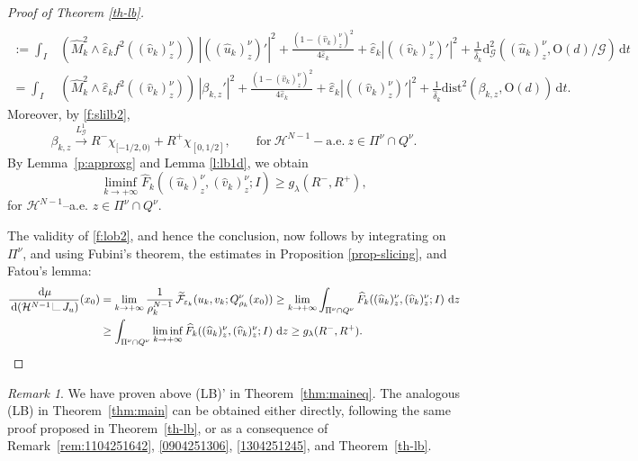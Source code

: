 \documentclass[a4paper,reqno]{amsart}
\newcommand{\dG}{\mathrm{d}_{\G}}
\newcommand\calH{\mathcal{H}}
\newcommand\toG{\xrightarrow{{L}^1_\G}}
\newcommand\dist{{\mathrm{dist}}}
\newcommand\eps{{\varepsilon}}
\newcommand\di{{\,\mathrm{d}}}
\newcommand\dt{{\,\mathrm{d}t}}
\newcommand{\LM}[1]{\hbox{\vrule width.2pt \vbox to#1pt{\vfill \hrule width#1pt height.2pt}}}
\newcommand{\LL}{{\mathchoice
{\,\LM7\,}{\,\LM7\,}{\,\LM5\,}{\,\LM{3.35}\,}}}
\theoremstyle{remark}
\newtheorem{remark}[definition]{Remark}
\def\e{\varepsilon}
\newcommand{\F}{\mathcal{F}}
\newcommand{\G}{\mathcal{G}}
\newcommand{\tF}{\widetilde{\F}}
\newcommand{\On}{\mathrm{O}(d)}
\newcommand\uu{{u}}
\numberwithin{equation}{section}
\begin{document}
\begin{proof}[Proof of Theorem \ref{th-lb}]
\[\begin{split}
		\\  :=
		\int_{I} & (\widehat M_{k}^2\wedge \widehat\e_k f^2((\widehat v_k)^\nu_z))
		\,|((\widehat \uu_k)^\nu_z)' |^2 + \frac{(1-(\widehat v_k)^\nu_z)^2}{4\widehat \eps_k} +
		\widehat \eps_k |((\widehat v_k)^\nu_z)'|^2 +
		\frac{1}{\widehat\delta_k} \dG^2((\widehat \uu_k)^\nu_z , \On/\G) \dt  \\
		=
		\int_{I} & (\widehat M_{k}^2\wedge \widehat\e_k f^2((\widehat v_k)^\nu_z))
		\,|\beta_{k,z}' |^2 + \frac{(1-(\widehat v_k)^\nu_z)^2}{4\widehat \eps_k} +
		\widehat \eps_k |((\widehat v_k)^\nu_z)'|^2 +
		\frac{1}{\widehat\delta_k} \dist^2(\beta_{k,z} , \On) \dt.
	\end{split}
	\]
	Moreover, by \eqref{f:slilb2},
	\begin{equation*}
		 \beta_{k,z} \toG R^-\chi_{[-1/2,0)}+R^+\chi_{[0,1/2]},
		\qquad \text{for}\ \calH^{N-1}-\text{a.e.}\ z\in \Pi^\nu\cap Q^\nu.
	\end{equation*}
By Lemma~\ref{p:approxg} and Lemma \ref{l:lb1d},
we obtain
	\[
	\liminf_{k\to +\infty} \widehat F_k((\widehat \uu_k)^\nu_z,  (\widehat v_k)^\nu_z;I)
	\geq g_\lambda (R^-,R^+),
	\]
	for $\calH^{N-1}$--a.e. $z\in \Pi^\nu\cap Q^\nu$.
	
	The validity of \eqref{f:lob2}, and hence the conclusion, now follows by integrating on $\Pi^\nu$, and using Fubini's theorem, the estimates in Proposition \ref{prop-slicing}, and Fatou's lemma:
	\[
	\begin{split}
		\frac{\di\mu}{\di(\calH^{N-1}\LL J_u)}(x_0) &
		=  \lim_{k\to +\infty} \frac 1{\rho_k^{N-1}}\, \tF_{\e_k} (u_k,v_k;  Q^\nu_{\rho_k}(x_0)) 
		\geq   \lim_{k\to +\infty} 
		\int_{\Pi^\nu\cap Q^\nu} \widehat F_k((\widehat \uu_k)^\nu_z,  (\widehat v_k)^\nu_z;I)\,  \di z
		\\  &
		\geq \int_{\Pi^\nu\cap Q^\nu} \liminf_{k\to +\infty} \widehat F_k((\widehat \uu_k)^\nu_z,  (\widehat v_k)^\nu_z;I)\, \di z
		\geq g_\lambda (R^-,R^+)
		. \qedhere
	\end{split}
	\]
\end{proof}

\begin{remark}\label{rem:1404251131}
	We have proven above (LB)' in Theorem~\ref{thm:maineq}.  The analogous (LB) in Theorem~\ref{thm:main} can be  obtained either directly, following the same proof proposed in Theorem~\ref{th-lb}, or as a consequence of  Remark~\ref{rem:1104251642}, \eqref{0904251306}, \eqref{1304251245}, and Theorem~\ref{th-lb}.
\end{remark}
\end{document}
